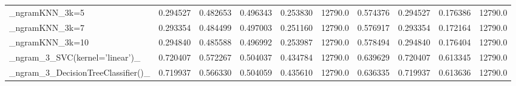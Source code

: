 \begin{tabular}{lrrrrrrrrr}
\_ngramKNN\_3k=5                                     &  0.294527 &         0.482653 &      0.496343 &        0.253830 &        12790.0 &            0.574376 &         0.294527 &           0.176386 &           12790.0 \\
\_ngramKNN\_3k=7                                     &  0.293354 &         0.484499 &      0.497003 &        0.251160 &        12790.0 &            0.576917 &         0.293354 &           0.172164 &           12790.0 \\
\_ngramKNN\_3k=10                                    &  0.294840 &         0.485588 &      0.496992 &        0.253987 &        12790.0 &            0.578494 &         0.294840 &           0.176404 &           12790.0 \\
\_ngram\_3\_SVC(kernel='linear')\_                     &  0.720407 &         0.572267 &      0.504037 &        0.434784 &        12790.0 &            0.639629 &         0.720407 &           0.613345 &           12790.0 \\
\_ngram\_3\_DecisionTreeClassifier()\_                 &  0.719937 &         0.566330 &      0.504059 &        0.435610 &        12790.0 &            0.636335 &         0.719937 &           0.613636 &           12790.0 \\
\bottomrule
\end{tabular}
